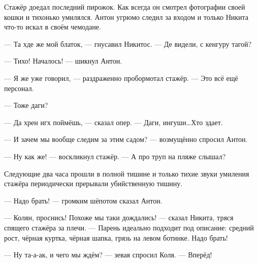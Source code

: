 \asterisks

Стажёр доедал последний пирожок. Как всегда он смотрел фотографии своей кошки и тихонько умилялся. Антон угрюмо следил за входом и только Никита что-то искал в своём чемодане.

--- Та хде же мой блаток, --- гнусавил Никитос. --- Де видели, с кенгуру тагой?

--- Тихо! Началось! --- шикнул Антон.

--- Я же уже говорил, --- раздраженно пробормотал стажёр. --- Это всё ещё персонал.

--- Тоже даги?

--- Да хрен игх поймёшь, --- сказал опер. --- Даги, ингуши\ldots Хто здает.

--- И зачем мы вообще следим за этим садом? --- возмущённо спросил Антон.

--- Ну как же! --- воскликнул стажёр. --- А про труп на пляже слышал?

Следующие два часа прошли в полной тишине и только тихие звуки умиления стажёра периодически прерывали убийственную тишину. 

\asterisks

--- Надо брать! --- громким шёпотом сказал Антон.

--- Колян, проснись! Похоже мы таки дождались! --- сказал Никита, тряся спящего стажёра за плечи. --- Парень идеально подходит под описание: средний рост, чёрная куртка, чёрная шапка, грязь на левом ботинке. Надо брать!

--- Ну та-а-ак, и чего мы ждём? --- зевая спросил Коля. --- Вперёд!

